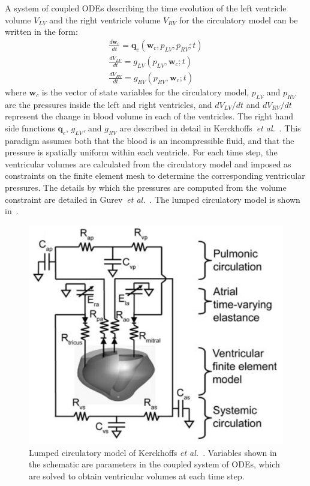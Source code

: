 A system of coupled ODEs describing the time evolution of the left ventricle volume $V_{LV}$ and the right ventricle volume $V_{RV}$ for the circulatory model can be written in the form:
\begin{align}
\frac{d\bm{w}_{c}}{dt} = \bm{q}_c(\bm{w}_c, p_{LV}, p_{RV}; t) \\
\frac{dV_{LV}}{dt} = g_{LV}(p_{LV}, \bm{w}_c; t) \\
\frac{dV_{RV}}{dt} = g_{RV}(p_{RV}, \bm{w}_c; t)
\end{align}
where $\bm{w}_c$ is the vector of state variables for the circulatory model, $p_{LV}$ and $p_{RV}$ are the pressures inside the left and right ventricles, and ${dV_{LV}}/{dt}$ and ${dV_{RV}}/{dt}$ represent the change in blood volume in each of the ventricles. The right hand side functions $\bm{q}_c$, $g_{LV}$, and $g_{RV}$ are described in detail in Kerckhoffs~\textit{et al.}~\cite{kerckhoffs_2006}. This paradigm assumes both that the blood is an incompressible fluid, and that the pressure is spatially uniform within each ventricle. For each time step, the ventricular volumes are calculated from the circulatory model and imposed as constraints on the finite element mesh to determine the corresponding ventricular pressures. The details by which the pressures are computed from the volume constraint are detailed in Gurev~\textit{et al.}~\cite{gurev_2015}. The lumped circulatory model is shown in~.
\begin{figure}[ht]
\centering
		\includegraphics[scale=0.3]{media/bcs.png}
\caption{Lumped circulatory model of Kerckhoffs \textit{et al.}~\cite{kerckhoffs_2006}. Variables shown in the schematic are parameters in the coupled system of ODEs, which are solved to obtain ventricular volumes at each time step.}
\label{fig:bcs}
\end{figure}

